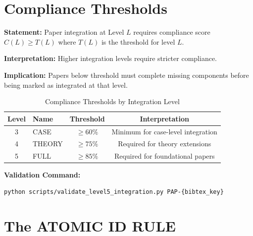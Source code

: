 \section{Compliance Thresholds}
\label{sec:paperint-compliance}

\begin{tcolorbox}[colback=gray!5!white, colframe=gray!75!black,
    title=Axiom PINT-2: Threshold Enforcement]
\textbf{Statement:} Paper integration at Level $L$ requires compliance score
$C(L) \geq T(L)$ where $T(L)$ is the threshold for level $L$.

\textbf{Interpretation:} Higher integration levels require stricter compliance.

\textbf{Implication:} Papers below threshold must complete missing components
before being marked as integrated at that level.
\end{tcolorbox}

\begin{table}[htbp]
\centering
\caption{Compliance Thresholds by Integration Level}
\label{tab:compliance-thresholds}
\renewcommand{\arraystretch}{1.3}
\begin{tabular}{@{}clcc@{}}
\toprule
\textbf{Level} & \textbf{Name} & \textbf{Threshold} & \textbf{Interpretation} \\
\midrule
3 & CASE & $\geq 60\%$ & Minimum for case-level integration \\
4 & THEORY & $\geq 75\%$ & Required for theory extensions \\
5 & FULL & $\geq 85\%$ & Required for foundational papers \\
\bottomrule
\end{tabular}
\end{table}

\textbf{Validation Command:}
\begin{verbatim}
python scripts/validate_level5_integration.py PAP-{bibtex_key}
\end{verbatim}


\section{The ATOMIC ID RULE}
\label{sec:paperint-atomic}

